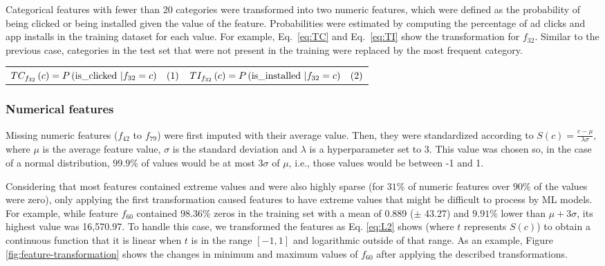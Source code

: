\documentclass[manuscript,nonacm]{acmart}
\begin{document}
Categorical features with fewer than 20 categories were transformed into two numeric features, which were defined as the probability of being clicked or being installed given the value of the feature. Probabilities were estimated by computing the percentage of ad clicks and app installs in the training dataset for each value. For example, Eq.~\ref{eq:TC} and Eq.~\ref{eq:TI} show the transformation for $f_{32}$. Similar to the previous case, categories in the test set that were not present in the training were replaced by the most frequent category.\vspace{-0.75cm}





\begin{table}[H]
    \centering
   
\begin{tabular}{cc}

$ TC_{f_{32}} \left(c\right) = P\left(\text{is\_clicked } | f_{32} = c\right) \hspace{0.3cm}\refstepcounter{equation}(\theequation)\label{eq:TC}$ 
& 
$  TI_{f_{32}} \left(c\right) = P\left(\text{is\_installed } | f_{32} = c\right)
\hspace{0.3cm}\refstepcounter{equation}(\theequation)\label{eq:TI}$

    \end{tabular}\vspace{-0.5cm}
   
\end{table}

\subsubsection*{\textbf{Numerical features}}\hfill 

Missing numeric features ($f_42$ to $f_79$) were first imputed with their average value. Then, they were standardized according to $ S\left(c\right) = \frac{c-\mu}{\lambda\sigma}$, where $\mu$ is the average feature value, $\sigma$ is the standard deviation and $\lambda$ is a hyperparameter set to 3. This value was chosen so, in the case of a normal distribution, $99.9\%$ of values would be at most $3\sigma$ of $\mu$, i.e., those values would be between -1 and 1.

Considering that most features contained extreme values and were also highly sparse (for $31\%$ of numeric features over $90\%$ of the values were zero), only applying the first transformation caused features to have extreme values that might be difficult to process by ML models. For example, while feature $f_{60}$ contained $98.36\%$ zeros in the training set with a mean of 0.889 ($\pm$ 43.27) and $9.91\%$ lower than $\mu + 3\sigma$, its highest value was 16,570.97. To handle this case, we transformed the features as Eq. \ref{eq:L2} shows (where $t$ represents $S(c)$) to obtain a continuous function that it is linear when $t$ is in the range $[-1,1]$ and logarithmic outside of that range. As an example, Figure \ref{fig:feature-transformation} shows the changes in minimum and maximum values of $f_60$ after applying the described transformations.\vspace{-0.3cm}
\end{document}
